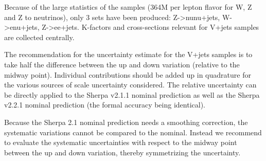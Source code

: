 Because of the large statistics of the samples (364M per lepton flavor for W, Z and Z to neutrinos), only 3 sets have been produced: Z->nunu+jets, W->enu+jets, Z->ee+jets. K-factors and cross-sections relevant for V+jets samples are collected centrally.

The recommendation for the uncertainty estimate for the V+jets samples is to take half the difference between the up and down variation (relative to the midway point). Individual contributions should be added up in quadrature for the various sources of scale uncertainty considered. The relative uncertainty can be directly applied to the Sherpa v2.1.1 nominal prediction as well as the Sherpa v2.2.1 nominal prediction (the formal accuracy being identical). 

Because the Sherpa 2.1 nominal prediction needs a smoothing correction, the systematic variations cannot be compared to the nominal. Instead we recommend to evaluate the systematic uncertainties with respect to the midway point between the up and down variation, thereby symmetrizing the uncertainty. 